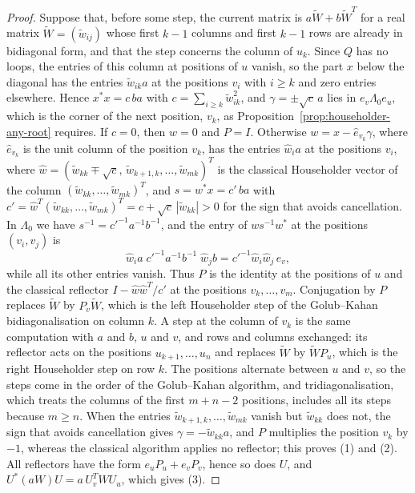 \documentclass[12pt, a4paper]{report}
\theoremstyle{plain}
\theoremstyle{definition}
\theoremstyle{remark}
\theoremstyle{plain}
\begin{document}
\begin{proof}
Suppose that, before some step, the current matrix is $a\tilde W+b\tilde W^T$ for a real matrix $\tilde W=(\tilde w_{ij})$ whose first $k-1$ columns and first $k-1$ rows are already in bidiagonal form, and that the step concerns the column of $u_k$. Since $Q$ has no loops, the entries of this column at positions of $u$ vanish, so the part $x$ below the diagonal has the entries $\tilde w_{ik}a$ at the positions $v_i$ with $i\geq k$ and zero entries elsewhere. Hence $x^*x=c\,ba$ with $c=\sum_{i\geq k}\tilde w_{ik}^2$, and $\gamma=\pm\sqrt c\,a$ lies in $e_v\Lambda_0e_u$, which is the corner of the next position, $v_k$, as Proposition~\ref{prop:householder-any-root} requires. If $c=0$, then $w=0$ and $P=I$. Otherwise $w=x-\hat e_{v_k}\gamma$, where $\hat e_{v_k}$ is the unit column of the position $v_k$, has the entries $\hat w_ia$ at the positions $v_i$, where $\hat w=(\tilde w_{kk}\mp\sqrt c,\,\tilde w_{k+1,k},\dots,\tilde w_{mk})^T$ is the classical Householder vector of the column $(\tilde w_{kk},\dots,\tilde w_{mk})^T$, and $s=w^*x=c'\,ba$ with $c'=\hat w^T(\tilde w_{kk},\dots,\tilde w_{mk})^T=c+\sqrt c\,|\tilde w_{kk}|>0$ for the sign that avoids cancellation. In $\Lambda_0$ we have $s^{-1}=c'^{-1}a^{-1}b^{-1}$, and the entry of $ws^{-1}w^*$ at the positions $(v_i,v_j)$ is
\[ \hat w_ia\;c'^{-1}a^{-1}b^{-1}\;\hat w_jb=c'^{-1}\hat w_i\hat w_j\,e_v , \]
while all its other entries vanish. Thus $P$ is the identity at the positions of $u$ and the classical reflector $I-\hat w\hat w^T/c'$ at the positions $v_k,\dots,v_m$. Conjugation by $P$ replaces $\tilde W$ by $P_v\tilde W$, which is the left Householder step of the Golub--Kahan bidiagonalisation on column $k$. A step at the column of $v_k$ is the same computation with $a$ and $b$, $u$ and $v$, and rows and columns exchanged: its reflector acts on the positions $u_{k+1},\dots,u_n$ and replaces $\tilde W$ by $\tilde WP_u$, which is the right Householder step on row $k$. The positions alternate between $u$ and $v$, so the steps come in the order of the Golub--Kahan algorithm, and tridiagonalisation, which treats the columns of the first $m+n-2$ positions, includes all its steps because $m\geq n$. When the entries $\tilde w_{k+1,k},\dots,\tilde w_{mk}$ vanish but $\tilde w_{kk}$ does not, the sign that avoids cancellation gives $\gamma=-\tilde w_{kk}a$, and $P$ multiplies the position $v_k$ by $-1$, whereas the classical algorithm applies no reflector; this proves (1) and (2). All reflectors have the form $e_uP_u+e_vP_v$, hence so does $U$, and $U^*(aW)U=a\,U_v^TWU_u$, which gives (3).
\end{proof}
\end{document}
